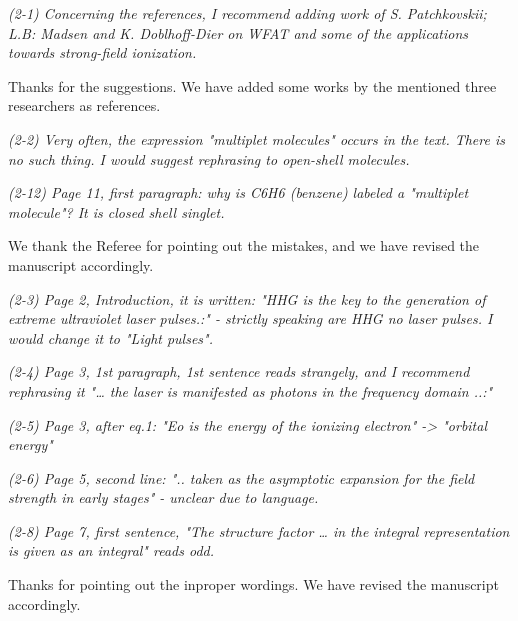 \documentclass[a4paper,11pt]{article}
\begin{document}

\textit{
(2-1)
Concerning the references, I recommend adding work of S. Patchkovskii; L.B: Madsen and K. Doblhoff-Dier on WFAT and some of the applications towards strong-field ionization.
}

\vspace{1em}

Thanks for the suggestions.
We have added some works by the mentioned three researchers as references.

\vspace{2em}


\textit{
(2-2)
Very often, the expression "multiplet molecules" occurs in the text. There is no such thing. I would suggest rephrasing to open-shell molecules.
}

\textit{
(2-12)
Page 11, first paragraph: why is C6H6 (benzene) labeled a "multiplet molecule"? It is closed shell singlet.
}

\vspace{1em}

We thank the Referee for pointing out the mistakes, and we have revised the manuscript accordingly.

\vspace{2em}


\textit{
(2-3)
Page 2, Introduction, it is written: "HHG is the key to the generation of extreme ultraviolet laser pulses.:" - strictly speaking are HHG no laser pulses. I would change it to "Light pulses".
}

\textit{
(2-4)
Page 3, 1st paragraph, 1st sentence reads strangely, and I recommend rephrasing it "… the laser is manifested as photons in the frequency domain ..:"
}

\textit{
(2-5)
Page 3, after eq.1: "Eo is the energy of the ionizing electron" -> "orbital energy"
}

\textit{
(2-6)
Page 5, second line: ".. taken as the asymptotic expansion for the field strength in early stages" - unclear due to language.
}

\textit{
(2-8)
Page 7, first sentence, "The structure factor … in the integral representation is given as an integral" reads odd.
}

\vspace{1em}

Thanks for pointing out the inproper wordings. We have revised the manuscript accordingly.
\end{document}
